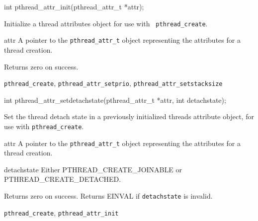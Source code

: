 \begin{apisyn}

	\funcproto int pthread_attr_init(pthread_attr_t *attr);
\end{apisyn}
\begin{apidesc}
	Initialize a thread attributes object for use with {\tt
	pthread_create}. 
\end{apidesc}
\begin{apiparm}
	\item[attr]
		A pointer to the {\tt pthread_attr_t} object
		representing the attributes for a thread creation.
\end{apiparm}
\begin{apiret}
	Returns zero on success.
\end{apiret}
\begin{apirel}
	{\tt pthread_create}, {\tt pthread_attr_setprio},
	{\tt pthread_attr_setstacksize}
\end{apirel}


\begin{apisyn}

	\funcproto int pthread_attr_setdetachstate(pthread_attr_t *attr,
                                                   int detachstate);
\end{apisyn}
\begin{apidesc}
	Set the thread detach state in a previously initialized threads
	attribute object, for use with {\tt pthread_create}. 
\end{apidesc}
\begin{apiparm}
	\item[attr]
		A pointer to the {\tt pthread_attr_t} object
		representing the attributes for a thread creation.
	\item[detachstate]
		Either PTHREAD_CREATE_JOINABLE or PTHREAD_CREATE_DETACHED. 
\end{apiparm}
\begin{apiret}
	Returns zero on success. Returns EINVAL if {\tt detachstate} is 
	invalid.
\end{apiret}
\begin{apirel}
	{\tt pthread_create}, {\tt pthread_attr_init}
\end{apirel}


